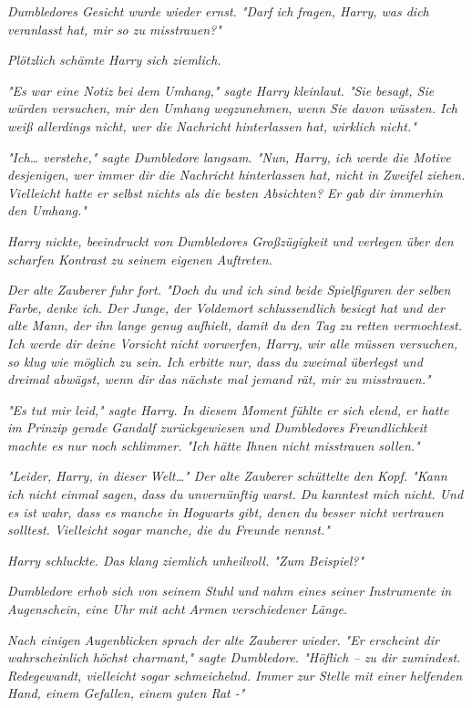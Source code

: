 {\emph{Dumbledores Gesicht wurde wieder ernst. "Darf ich fragen, Harry, was dich veranlasst hat, mir so zu misstrauen?"}

\emph{Plötzlich schämte Harry sich ziemlich.}

\emph{"Es war eine Notiz bei dem Umhang," sagte Harry kleinlaut. "Sie besagt, Sie würden versuchen, mir den Umhang wegzunehmen, wenn Sie davon wüssten. Ich weiß allerdings nicht, wer die Nachricht hinterlassen hat, wirklich nicht."}

\emph{"Ich… verstehe," sagte Dumbledore langsam. "Nun, Harry, ich werde die Motive desjenigen, wer immer dir die Nachricht hinterlassen hat, nicht in Zweifel ziehen. Vielleicht hatte er selbst nichts als die besten Absichten? Er gab dir immerhin den Umhang."}

\emph{Harry nickte, beeindruckt von Dumbledores Großzügigkeit und verlegen über den scharfen Kontrast zu seinem eigenen Auftreten.}

\emph{Der alte Zauberer fuhr fort. "Doch du und ich sind beide Spielfiguren der selben Farbe, denke ich. Der Junge, der Voldemort schlussendlich besiegt hat und der alte Mann, der ihn lange genug aufhielt, damit du den Tag zu retten vermochtest. Ich werde dir deine Vorsicht nicht vorwerfen, Harry, wir alle müssen versuchen, so klug wie möglich zu sein. Ich erbitte nur, dass du zweimal überlegst und dreimal abwägst, wenn dir das nächste mal jemand rät, mir zu misstrauen."}

\emph{"Es tut mir leid," sagte Harry. In diesem Moment fühlte er sich elend, er hatte im Prinzip gerade Gandalf zurückgewiesen und Dumbledores} \emph{Freundlichkeit machte es nur noch schlimmer. "Ich hätte Ihnen nicht misstrauen sollen."}

\emph{"Leider, Harry, in dieser Welt…" Der alte Zauberer schüttelte den Kopf. "Kann ich nicht einmal sagen, dass du unvernünftig warst. Du kanntest mich nicht. Und es ist wahr, dass es manche in Hogwarts gibt, denen du besser nicht vertrauen solltest. Vielleicht sogar manche, die du Freunde nennst."}

\emph{Harry schluckte. Das klang ziemlich unheilvoll. "Zum Beispiel?"}

\emph{Dumbledore erhob sich von seinem Stuhl und nahm eines seiner Instrumente in Augenschein, eine Uhr mit acht Armen verschiedener Länge.}

\emph{Nach einigen Augenblicken sprach der alte Zauberer wieder. "Er erscheint dir wahrscheinlich höchst charmant," sagte Dumbledore. "Höflich -- zu dir zumindest. Redegewandt, vielleicht sogar schmeichelnd. Immer zur Stelle mit einer helfenden Hand, einem Gefallen, einem guten Rat -"}

}
